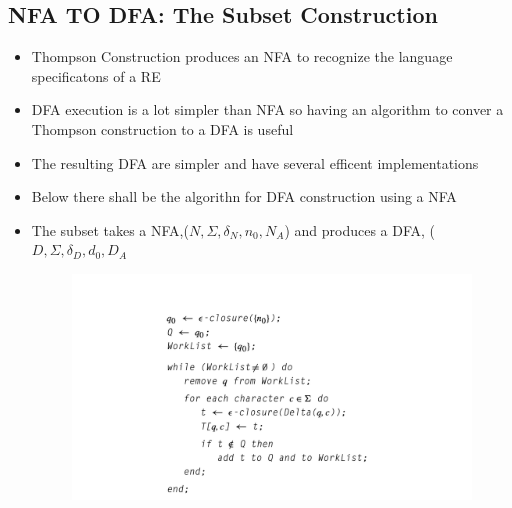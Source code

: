 \documentclass[20pt]{article}
\begin{document}
            \subsection*{NFA TO DFA: The Subset Construction}
                        \begin{itemize}
                            \item Thompson Construction produces an NFA to recognize the language specificatons of a RE
                            \item DFA execution is a lot simpler than NFA so having an algorithm to conver a Thompson construction to a DFA is useful
                            \item The resulting DFA are simpler and have several efficent implementations
                            \newpage
                            \item Below there shall be the algorithn for DFA construction using a NFA
                            \item The subset takes a NFA,($N, \Sigma, \delta_{N}, n_{0}, N_{A}$) and produces a DFA, ($D,\Sigma,\delta_{D}, d_{0}, D_{A} $
                            \begin{figure}[h]
                                \includegraphics[width= \textwidth]{Images/subsetconstruction.png}
                            \end{figure}
                        \end{itemize}
\end{document}
